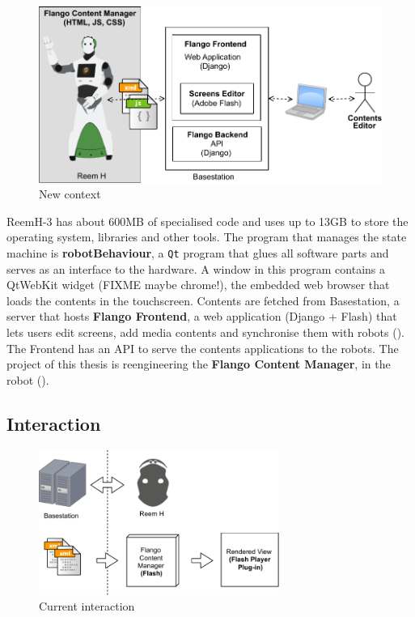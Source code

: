 \begin{figure}[htb]
    \centering
    \includegraphics[width=\textwidth]{figures/context-new}
    \caption{New context}
    \label{fig:context-new}
\end{figure}

ReemH-3 has about 600MB of specialised code and uses up to 13GB to store the operating system, libraries and other tools.
The program that manages the state machine is \textbf{robotBehaviour}, a \texttt{Qt} program that glues all software parts and serves as an interface to the hardware.
A window in this program contains a QtWebKit widget (FIXME maybe chrome!), the embedded web browser that loads the contents in the touchscreen.
Contents are fetched from Basestation, a server that hosts \textbf{Flango Frontend}, a web application (Django + Flash) that lets users edit screens, add media contents and synchronise them with robots ().
The Frontend has an \ac{API} to serve the contents applications to the robots.
The project of this thesis is reengineering the \textbf{Flango Content Manager}, in the robot ().

\subsection{Interaction}
\begin{figure}[htb]
    \centering
    \includegraphics[width=0.7\textwidth]{figures/interaction-original}
    \caption{Current interaction}
    \label{fig:interaction-original}
\end{figure}

